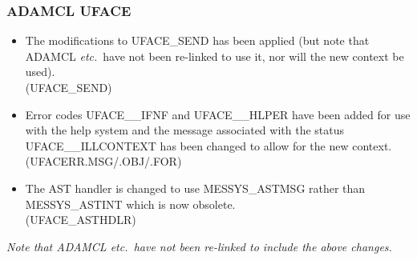 \subsubsection{ADAMCL UFACE}
\begin{itemize}
\item The modifications to UFACE\_SEND has been applied (but note that ADAMCL
{\em etc.}\ have not been re-linked to use it, nor will the new context be
used).\\
(UFACE\_SEND)
\item Error codes UFACE\_\_IFNF and UFACE\_\_HLPER have been added for use
with the help system and
the message associated with the status UFACE\_\_ILLCONTEXT has been
changed to allow for the new context.\\
(UFACERR.MSG/.OBJ/.FOR)
\item The AST handler is changed to use MESSYS\_ASTMSG rather than
MESSYS\_ASTINT which is now obsolete.\\
(UFACE\_ASTHDLR)
\end{itemize}
{\em Note that ADAMCL etc.\ have not been re-linked to include the above
changes.}

